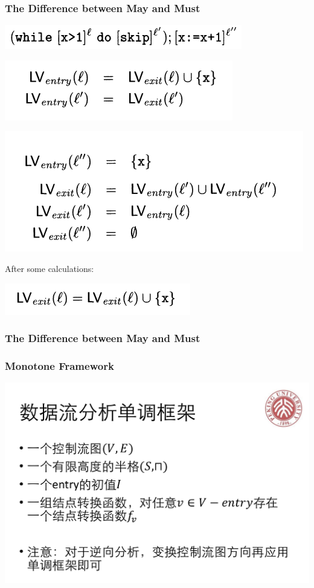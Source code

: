 \documentclass[aspectratio=1610, 13pt]{beamer}
\begin{document}
\begin{frame}\frametitle{The Difference between May and Must}

\begin{center}
\includegraphics[scale=0.4]{lv_example.png}

\includegraphics[scale=0.4]{lv_ex_eq.png}

\includegraphics[scale=0.4]{lv_ex_eq2.png}
\end{center}
After some calculations:
\begin{center}
\includegraphics[scale=0.4]{simplified.png}
\end{center}
\end{frame}

\begin{frame}\frametitle{The Difference between May and Must}



\end{frame}


\begin{frame}\frametitle{Monotone Framework}
\begin{center}
\includegraphics[scale=0.25]{framework.png}
\end{center}
\end{frame}
\end{document}
